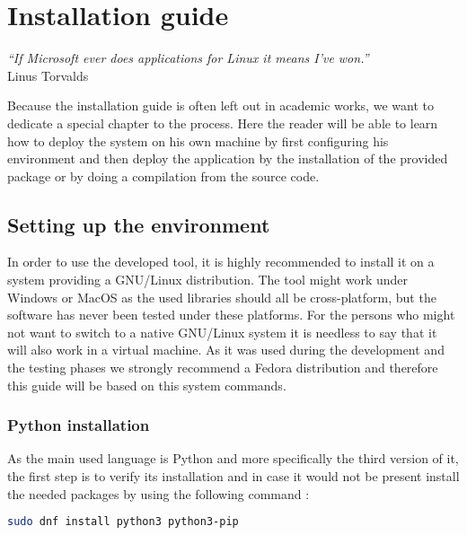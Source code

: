 

\chapter{Installation guide} %
\label{chap:installation}
\begin{flushright}
\textit{``If Microsoft ever does applications for Linux it means I've won.''} \\ Linus Torvalds
\end{flushright}


Because the installation guide is often left out in academic works, we want to dedicate a special chapter to the process. Here the reader will be able to learn how to deploy the system on his own machine by first configuring his environment and then deploy the application by the installation of the provided package or by doing a compilation from the source code.

\section {Setting up the environment}

In order to use the developed tool, it is highly recommended to install it on a system providing a GNU/Linux distribution. The tool might work under Windows or MacOS as the used libraries should all be cross-platform, but the software has never been tested under these platforms. For the persons who might not want to switch to a native GNU/Linux system it is needless to say that it will also work in a virtual machine. As it was used during the development and the testing phases we strongly recommend a Fedora distribution and therefore this guide will be based on this system commands.

\subsection{Python installation}

As the main used language is Python and more specifically the third version of it, the first step is to verify its installation and in case it would not be present install the needed packages by using the following command :
\begin{lstlisting}[language=bash]
sudo dnf install python3 python3-pip
\end{lstlisting}

